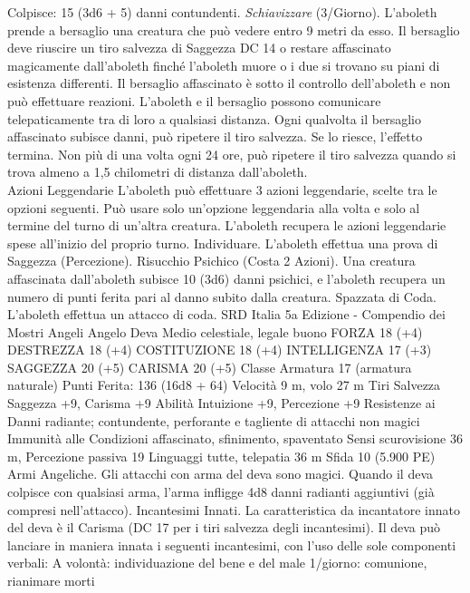 \begin{multicols}{2}
Colpisce: 15 (3d6 + 5) danni contundenti.
\textit{Schiavizzare} (3/Giorno). L’aboleth prende a bersaglio una creatura che può vedere entro 9 metri da esso. Il bersaglio deve riuscire un tiro salvezza di Saggezza DC 14 o restare affascinato magicamente dall’aboleth finché l’aboleth muore o i due si trovano su piani di esistenza differenti. Il bersaglio affascinato è sotto il controllo dell’aboleth e non può effettuare reazioni. L’aboleth e il bersaglio possono comunicare telepaticamente tra di loro a qualsiasi distanza.  Ogni qualvolta il bersaglio affascinato subisce danni, può ripetere il tiro salvezza. Se lo riesce, l’effetto termina. Non più di una volta ogni 24 ore, può ripetere il tiro salvezza quando si trova almeno a 1,5 chilometri di distanza dall’aboleth.\\

Azioni Leggendarie
L’aboleth può effettuare 3 azioni leggendarie, scelte tra le
opzioni seguenti. Può usare solo un’opzione leggendaria alla
volta e solo al termine del turno di un’altra creatura. L’aboleth
recupera le azioni leggendarie spese all’inizio del proprio turno.
Individuare. L’aboleth effettua una prova di Saggezza (Percezione).
Risucchio Psichico (Costa 2 Azioni). Una creatura affascinata
dall’aboleth subisce 10 (3d6) danni psichici, e l’aboleth recupera un
numero di punti ferita pari al danno subito dalla creatura.
Spazzata di Coda. L’aboleth effettua un attacco di coda.
SRD Italia 5a Edizione - Compendio dei Mostri
Angeli
Angelo Deva
Medio celestiale, legale buono
FORZA 18 (+4)
DESTREZZA 18 (+4)
COSTITUZIONE 18 (+4)
INTELLIGENZA 17 (+3)
SAGGEZZA 20 (+5)
CARISMA 20 (+5)
Classe Armatura 17 (armatura naturale)
\hspace*{0pt}\hfill{Punti Ferita}: 136 (16d8 + 64)
Velocità 9 m, volo 27 m
Tiri Salvezza Saggezza +9, Carisma +9
Abilità Intuizione +9, Percezione +9
Resistenze ai Danni radiante; contundente, perforante e tagliente
di attacchi non magici
Immunità alle Condizioni affascinato, sfinimento, spaventato
Sensi scurovisione 36 m, Percezione passiva 19
Linguaggi tutte, telepatia 36 m
Sfida 10 (5.900 PE)
Armi Angeliche. Gli attacchi con arma del deva sono magici.
Quando il deva colpisce con qualsiasi arma, l’arma infligge 4d8
danni radianti aggiuntivi (già compresi nell’attacco).
Incantesimi Innati. La caratteristica da incantatore innato del
deva è il Carisma (DC 17 per i tiri salvezza degli incantesimi). Il
deva può lanciare in maniera innata i seguenti incantesimi, con
l’uso delle sole componenti verbali:
A volontà: individuazione del bene e del male
1/giorno: comunione, rianimare morti

\end{multicols}
